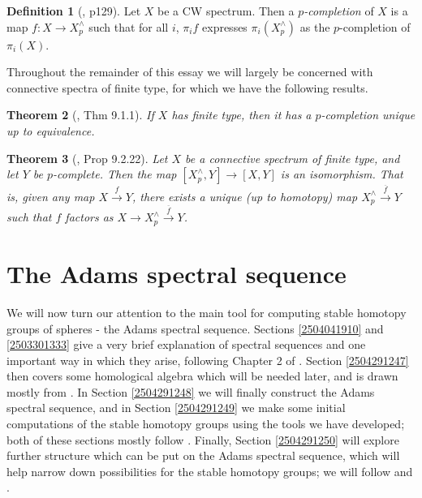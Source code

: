\documentclass[11pt, titlepage]{article} %
\numberwithin{equation}{subsection}
\theoremstyle{plain}
\newtheorem{theorem}{Theorem}[subsection]
\theoremstyle{definition}
\newtheorem{definition}[theorem]{Definition}
\begin{document}
\begin{definition}[{\autocite{spectra}, p129}]
Let \(X\) be a CW spectrum. Then a \textit{\(p\)-completion} of \(X\) is a map \(f : X \to X^\wedge_p\) such that for all \(i\), \(\pi_if\) expresses \(\pi_i(X^\wedge_p)\) as the \(p\)-completion of \(\pi_i(X)\).
\end{definition}

Throughout the remainder of this essay we will largely be concerned with connective spectra of finite type, for which we have the following results.

\begin{theorem}[{\autocite{spectra}, Thm 9.1.1}]
If \(X\) has finite type, then it has a \(p\)-completion unique up to equivalence. 
\end{theorem}

\begin{theorem}[{\autocite{spectra}, Prop 9.2.22}]\label{2504180925}
Let \(X\) be a connective spectrum of finite type, and let \(Y\) be \(p\)-complete. Then the map \([X^\wedge_p, Y]\to [X, Y]\) is an isomorphism. That is, given any map \(X \xrightarrow{f} Y\), there exists a unique (up to homotopy) map \(X^\wedge_p \xrightarrow{\overline f} Y\) such that \(f\) factors as \(X \to X^\wedge_p \xrightarrow{\overline f} Y\). 
\end{theorem}

\section{The Adams spectral sequence}

We will now turn our attention to the main tool for computing stable homotopy groups of spheres - the Adams spectral sequence. Sections \ref{2504041910} and \ref{2503301333} give a very brief explanation of spectral sequences and one important way in which they arise, following Chapter 2 of \autocite{spectral_sequences}. Section \ref{2504291247} then covers some homological algebra which will be needed later, and is drawn mostly from \autocite{weibel}. In Section \ref{2504291248} we will finally construct the Adams spectral sequence, and in Section \ref{2504291249} we make some initial computations of the stable homotopy groups using the tools we have developed; both of these sections mostly follow \autocite{hatcher5}. Finally, Section \ref{2504291250} will explore further structure which can be put on the Adams spectral sequence, which will help narrow down possibilities for the stable homotopy groups; we will follow \autocite{ass} and \autocite{rognes2}. 
\end{document}
